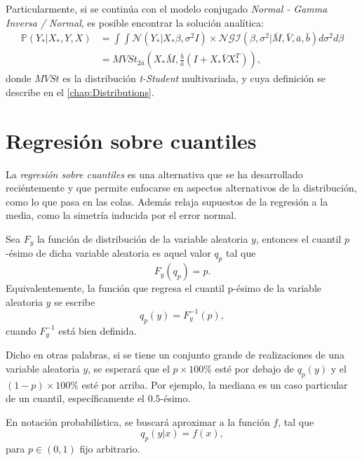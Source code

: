 Particularmente, si se contin\'ua con el modelo conjugado \textit{Normal - Gamma Inversa / Normal}, es posible encontrar la soluci\'on anal\'itica:
\begin{equation*}
\begin{aligned}
    \mathbb{P}(Y_*|X_*,Y,X)
    &= \int \int \mathcal{N}(Y_*|X_*\beta,\sigma^2I) \times \mathcal{NGI}(\beta,\sigma^2|\bar{M},\bar{V},\bar{a},\bar{b}) d\sigma^2 d\beta \\
    &= MVSt_{2\bar{a}} 
       \left(
        X_*\bar{M},\frac{\bar{b}}{\bar{a}}\left(I + X_*\bar{V}X_*^T\right)
       \right),
\end{aligned}
\end{equation*}
donde $MVSt$ es la distribuci\'on \textit{t-Student} multivariada, y cuya definici\'on se describe en el \autoref{chap:Distributions}.

\section{Regresión sobre cuantiles}

La \textit{regresi\'on sobre cuantiles} es una alternativa que se ha desarrollado reci\'entemente y que permite enfocarse en aspectos alternativos de la distribuci\'on, como lo que pasa en las colas. Adem\'as relaja supuestos de la regresi\'on a la media, como la simetr\'ia inducida por el error normal.

\begin{defin}
Sea $F_y$ la funci\'on de distribuci\'on de la variable aleatoria $y$, entonces el cuantil $p$-\'esimo de dicha variable aleatoria es aquel valor $q_p$ tal que
\begin{equation*}
    F_y(q_p) = p.
\end{equation*}
Equivalentemente, la funci\'on que regresa el cuantil p-\'esimo de la variable aleatoria $y$ se escribe
\begin{equation*}
    q_p(y) = F_y^{-1}(p),
\end{equation*}
cuando $F_y^{-1}$ est\'a bien definida.
\end{defin}
Dicho en otras palabras, si se tiene un conjunto grande de realizaciones de una variable aleatoria $y$, se esperar\'a que el $p \times 100\%$ est\'e por debajo de $q_p(y)$ y el $(1-p) \times 100\%$ est\'e por arriba. Por ejemplo, la mediana es un caso particular de un cuantil, espec\'ificamente el $0.5$-\'esimo. 

En notaci\'on probabil\'istica, se buscar\'a aproximar a la funci\'on $f$, tal que 
\begin{equation*}
    q_p(y|x) = f(x),
\end{equation*}
para $p \in (0,1)$ fijo arbitrario.

